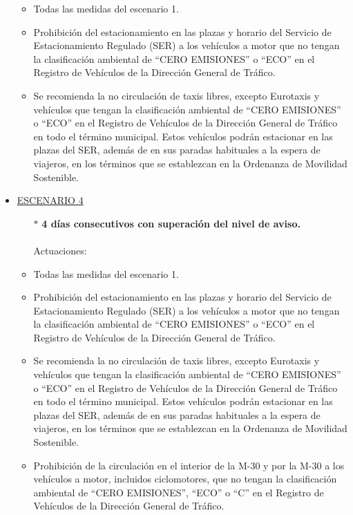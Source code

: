 \begin{itemize}
		\begin{itemize}
			\item Todas las medidas del escenario 1.
			\item Prohibición del estacionamiento en las plazas y horario del Servicio de Estacionamiento Regulado (SER) a los vehículos a motor que no tengan la clasificación ambiental de “CERO EMISIONES” o “ECO” en el Registro de Vehículos de la Dirección General de Tráfico. 		
			\item Se recomienda la no circulación de taxis libres, excepto Eurotaxis y vehículos que tengan la clasificación ambiental de “CERO EMISIONES” o “ECO” en el Registro de Vehículos de la Dirección General de Tráfico en todo el término municipal. Estos vehículos podrán estacionar en las plazas del SER, además de en sus paradas habituales a la espera de viajeros, en los términos que se establezcan en la Ordenanza de Movilidad Sostenible.
		\end{itemize}
	\item \underline{ESCENARIO 4}
		\begin{itemize}
			\item[$\ast$] \textbf{4 días consecutivos con superación del nivel de aviso. }
			\\ \\
			Actuaciones:
		\end{itemize}
		\begin{itemize}
			\item Todas las medidas del escenario 1.
			\item Prohibición del estacionamiento en las plazas y horario del Servicio de Estacionamiento Regulado (SER) a los vehículos a motor que no tengan la clasificación ambiental de “CERO EMISIONES” o “ECO” en el Registro de Vehículos de la Dirección General de Tráfico. 	
			\item Se recomienda la no circulación de taxis libres, excepto Eurotaxis y vehículos que tengan la clasificación ambiental de “CERO EMISIONES” o “ECO” en el Registro de Vehículos de la Dirección General de Tráfico en todo el término municipal. Estos vehículos podrán estacionar en las plazas del SER, además de en sus paradas habituales a la espera de viajeros, en los términos que se establezcan en la Ordenanza de Movilidad Sostenible.		
			\item Prohibición de la circulación en el interior de la M-30 y por la M-30 a los vehículos a motor, incluidos ciclomotores, que no tengan la clasificación ambiental de “CERO EMISIONES”, “ECO” o “C” en el Registro de Vehículos de la Dirección General de Tráfico. 
		\end{itemize}
\end{itemize}


